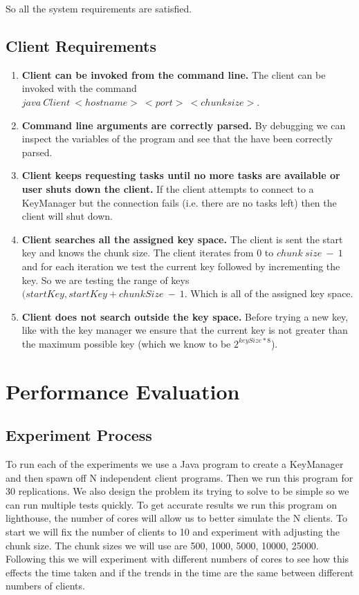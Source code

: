 \documentclass[a4paper, 12pt]{article}
\begin{document}
			So all the system requirements are satisfied.		
		
		\subsection{Client Requirements}
			\begin{enumerate}
				\item \textbf{Client can be invoked from the command line.} The client can be invoked with the command $java\ Client\ <hostname>\ <port>\ <chunk size>$.
			
				\item \textbf{Command line arguments are correctly parsed.} By debugging we can inspect the variables of the program and see that the have been correctly parsed.
				
				\item \textbf{Client keeps requesting tasks until no more tasks are available or user shuts down the client.} If the client attempts to connect to a KeyManager but the connection fails (i.e. there are no tasks left) then the client will shut down.
				
				\item \textbf{Client searches all the assigned key space.} The client is sent the start key and knows the chunk size. The client iterates from 0 to $chunk\ size\ -\ 1$ and for each iteration we test the current key followed by incrementing the key. So we are testing the range of keys $(startKey, startKey + chunkSize\ -\ 1$. Which is all of the assigned key space.
				
				\item \textbf{Client does not search outside the key space.} Before trying a new key, like with the key manager we ensure that the current key is not greater than the maximum possible key (which we know to be $2^{keySize * 8}$).
			\end{enumerate}
	
	\newpage		
			
	\section{Performance Evaluation}
		\subsection{Experiment Process}
			To run each of the experiments we use a Java program to create a KeyManager and then spawn off N independent client programs. Then we run this program for 30 replications. We also design the problem its trying to solve to be simple so we can run multiple tests quickly. To get accurate results we run this program on lighthouse, the number of cores will allow us to better simulate the N clients. To start we will fix the number of clients to 10 and experiment with adjusting the chunk size. The chunk sizes we will use are 500, 1000, 5000, 10000, 25000. Following this we will experiment with different numbers of cores to see how this effects the time taken and if the trends in the time are the same between different numbers of clients.\\
			
\end{document}
